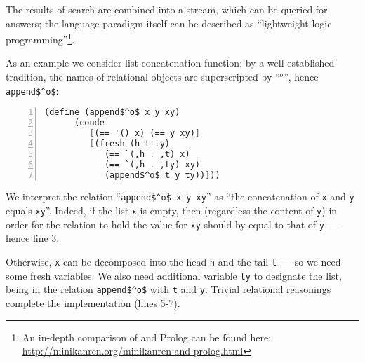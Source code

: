 The results of search are combined into a stream, which can be queried for answers; the language paradigm itself
can be described as ``lightweight logic programming''\footnote{An in-depth comparison of \miniKanren and Prolog can be found
here: \url{http://minikanren.org/minikanren-and-prolog.html}}.
 
As an example we consider list concatenation function; by a well-established tradition, the names 
of relational objects are superscripted by ``$^o$'', hence \lstinline{append$^o$}: 

\begin{lstlisting}[mathescape=true,language=scheme,numbers=left,numberstyle=\small,stepnumber=1,numbersep=-5pt]
   (define (append$^o$ x y xy) 
      (conde 
         [(== '() x) (== y xy)]
         [(fresh (h t ty)
            (== `(,h . ,t) x)
            (== `(,h . ,ty) xy)
            (append$^o$ t y ty))]))
\end{lstlisting}

We interpret the relation ``\lstinline{append$^o$ x y xy}'' as ``the concatenation of \lstinline{x} and \lstinline{y} 
equals \lstinline{xy}''. Indeed, if the list \lstinline{x} is empty, then (regardless the content of \lstinline{y}) in order for the relation to hold 
the value for \lstinline{xy} should by equal to that of \lstinline{y}~--- hence line 3. 

Otherwise, \lstinline{x} can be decomposed into the head \lstinline{h} and the tail \lstinline{t}~--- so we need some fresh variables. We also
need additional variable \lstinline{ty} to designate the list, being in the relation \lstinline{append$^o$} with \lstinline{t} and \lstinline{y}.
Trivial relational reasonings complete the implementation (lines 5-7).


